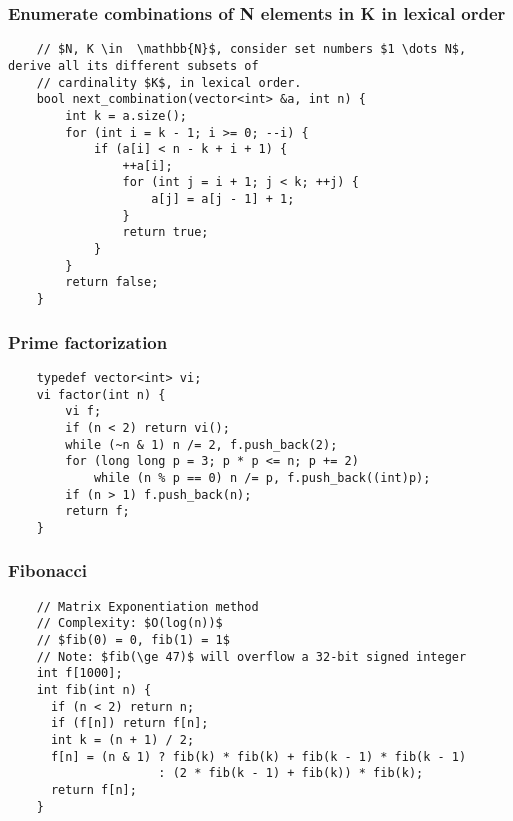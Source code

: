 \documentclass{article}
\begin{document}
\subsubsection{Enumerate combinations of N elements in K in lexical order}
\begin{verbatim}
    // $N, K \in  \mathbb{N}$, consider set numbers $1 \dots N$, derive all its different subsets of 
    // cardinality $K$, in lexical order.
    bool next_combination(vector<int> &a, int n) {
        int k = a.size();
        for (int i = k - 1; i >= 0; --i) {
            if (a[i] < n - k + i + 1) {
                ++a[i];
                for (int j = i + 1; j < k; ++j) {
                    a[j] = a[j - 1] + 1;
                }
                return true;
            }
        }
        return false;
    }
\end{verbatim}

\subsubsection{Prime factorization}
\begin{verbatim}
    typedef vector<int> vi;
    vi factor(int n) {
        vi f;
        if (n < 2) return vi();
        while (~n & 1) n /= 2, f.push_back(2);
        for (long long p = 3; p * p <= n; p += 2) 
            while (n % p == 0) n /= p, f.push_back((int)p);
        if (n > 1) f.push_back(n);
        return f;
    }
\end{verbatim}

\subsubsection{Fibonacci}
\begin{verbatim}
    // Matrix Exponentiation method
    // Complexity: $O(log(n))$
    // $fib(0) = 0, fib(1) = 1$
    // Note: $fib(\ge 47)$ will overflow a 32-bit signed integer
    int f[1000];
    int fib(int n) {
      if (n < 2) return n;
      if (f[n]) return f[n];
      int k = (n + 1) / 2;
      f[n] = (n & 1) ? fib(k) * fib(k) + fib(k - 1) * fib(k - 1)
                     : (2 * fib(k - 1) + fib(k)) * fib(k);
      return f[n];
    }
\end{verbatim}
\end{document}
